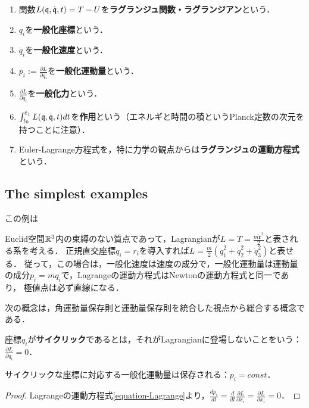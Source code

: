 \documentclass[uplatex,dvipdfmx]{jsreport}
\begin{document}
\begin{definition}\mbox{}
    \begin{enumerate}
        \item 関数$L(\mathfrak{q},\dot{\mathfrak{q}},t)=T-U$を\textbf{ラグランジュ関数・ラグランジアン}という．
        \item $q_i$を\textbf{一般化座標}という．
        \item $\dot{q}_i$を\textbf{一般化速度}という．
        \item $p_i:=\frac{\partial L}{\partial\dot{q}_i}$を\textbf{一般化運動量}という．
        \item $\frac{\partial L}{\partial q_i}$を\textbf{一般化力}という．
        \item $\int^{t_1}_{t_0}L(\mathfrak{q},\dot{\mathfrak{q}},t)dt$を\textbf{作用}という（エネルギと時間の積というPlanck定数の次元を持つことに注意）．
        \item Euler-Lagrange方程式を，特に力学の観点からは\textbf{ラグランジュの運動方程式}という．
    \end{enumerate}
\end{definition}

\subsection{The simplest examples}
この例は

\begin{example}[等速直線運動または静止]
    Euclid空間$\mathbb{R}^3$内の束縛のない質点であって，Lagrangianが$L=T=\frac{m\dot{\mathbf{r}}^2}{2}$と表される系を考える．
    正規直交座標$q_i=r_i$を導入すれば$L=\frac{m}{2}(\dot{q}_1^2+\dot{q}_2^2+\dot{q}_3^2)$と表せる．
    従って，この場合は，一般化速度は速度の成分で，一般化運動量は運動量の成分$p_i=m\dot{q}_i$で，Lagrangeの運動方程式はNewtonの運動方程式と同一であり，
    極値点は必ず直線になる．
\end{example}

\begin{example}[角運動量保存則の言い換え]
    
\end{example}

次の概念は，角運動量保存則と運動量保存則を統合した視点から総合する概念である．

\begin{definition}
    座標$q_i$が\textbf{サイクリック}であるとは，それがLagrangianに登場しないことをいう：$\frac{\partial L}{\partial\dot{q}_i}=0$．
\end{definition}
\begin{theorem}
    サイクリックな座標に対応する一般化運動量は保存される：$p_i=const$．
\end{theorem}
\begin{proof}
    Lagrangeの運動方程式\ref{equation-Lagrange}より，$\frac{dp_i}{dt}=\frac{d}{dt}\frac{\partial L}{\partial \dot{x}_i}=\frac{\partial L}{\partial x_i}=0$．
\end{proof}
\end{document}
